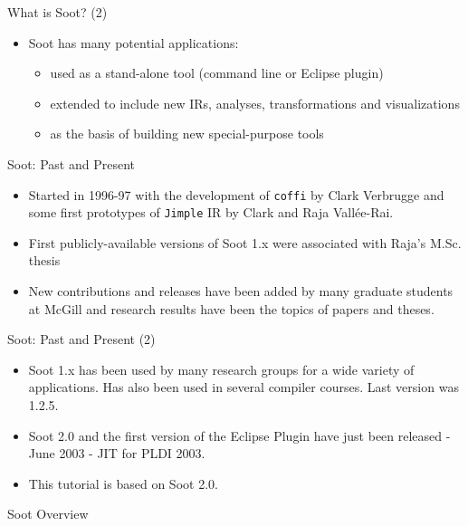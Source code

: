 \begin{slide}{What is Soot?  (2)}
\begin{itemize}
\item Soot has many potential applications:
\begin{itemize}
  \item used as a stand-alone tool (command line or Eclipse plugin)
  \item extended to include new IRs, analyses, transformations and 
        visualizations
  \item as the basis of building new special-purpose tools 
\end{itemize}
\end{itemize}
\end{slide}

\begin{slide}{Soot: Past and Present}
\begin{itemize}
\item Started in 1996-97 with the development of \texttt{coffi} by
Clark Verbrugge and some first prototypes of \texttt{Jimple} IR by
Clark and Raja Vall\'ee-Rai.
\item First publicly-available versions of Soot 1.x were associated 
with Raja's M.Sc. thesis
\item New contributions and releases have been added by many
graduate students at McGill and research results have been the topics
of papers and theses.
\end{itemize}
\end{slide}

\begin{slide}{Soot: Past and Present (2)}

\begin{itemize}
\item Soot 1.x has been used by many research groups for 
a wide variety of applications.   Has also been used in several
compiler courses.  Last version was 1.2.5.
\item Soot 2.0 and the first version of the Eclipse Plugin have just
been released - June 2003 - JIT for PLDI 2003.
\item This tutorial is based on Soot 2.0. 
\end{itemize}
\end{slide}

\begin{slide}{Soot Overview}
\vspace{-.3in}
\begin{center}
\end{center}
\end{slide}

